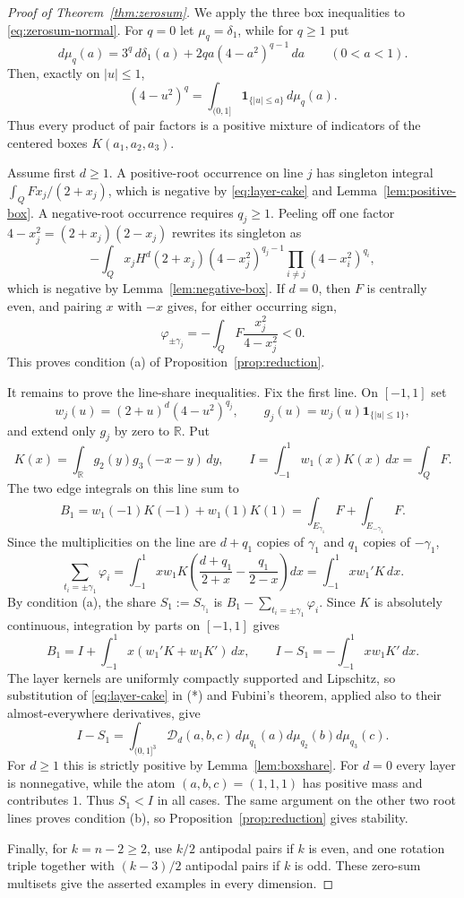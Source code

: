 \documentclass[11pt]{amsart}
\theoremstyle{definition}
\theoremstyle{remark}
\begin{document}
\begin{proof}[Proof of Theorem~\ref{thm:zerosum}]
We apply the three box inequalities to \eqref{eq:zerosum-normal}. For
$q=0$ let $\mu_q=\delta_1$, while for $q\ge1$ put
\begin{equation}\label{eq:layer-measure}
 d\mu_q(a)=3^q\,d\delta_1(a)
       +2qa(4-a^2)^{q-1}\,da\qquad(0<a<1).
\end{equation}
Then, exactly on $|u|\le1$,
\begin{equation}\label{eq:layer-cake}
 (4-u^2)^q
 =\int_{(0,1]}\mathbf1_{\{|u|\le a\}}\,d\mu_q(a).
\end{equation}
Thus every product of pair factors is a positive mixture of indicators of
the centered boxes $K(a_1,a_2,a_3)$.

Assume first $d\ge1$. A positive-root occurrence on line $j$ has
singleton integral $\int_QF x_j/(2+x_j)$, which is negative by
\eqref{eq:layer-cake} and Lemma~\ref{lem:positive-box}. A negative-root
occurrence requires $q_j\ge1$. Peeling off one factor
$4-x_j^2=(2+x_j)(2-x_j)$ rewrites its singleton as
\[
 -\int_Qx_jH^d(2+x_j)(4-x_j^2)^{q_j-1}
       \prod_{i\ne j}(4-x_i^2)^{q_i},
\]
which is negative by Lemma~\ref{lem:negative-box}. If $d=0$, then $F$ is
centrally even, and pairing $x$ with $-x$ gives, for either occurring sign,
\[
 \varphi_{\pm\gamma_j}=-\int_QF\frac{x_j^2}{4-x_j^2}<0.
\]
This proves condition (a) of Proposition~\ref{prop:reduction}.

It remains to prove the line-share inequalities. Fix the first line. On
$[-1,1]$ set
\[
 w_j(u)=(2+u)^d(4-u^2)^{q_j},\qquad
 g_j(u)=w_j(u)\mathbf1_{\{|u|\le1\}},
\]
and extend only $g_j$ by zero to $\mathbb R$. Put
\[
K(x)=\int_{\mathbb R}g_2(y)g_3(-x-y)\,dy,
 \qquad I=\int_{-1}^1w_1(x)K(x)\,dx=\int_QF.
\]
The two edge integrals on this line sum to
\[
 B_1=w_1(-1)K(-1)+w_1(1)K(1)
 =\int_{E_{\gamma_1}}F+\int_{E_{-\gamma_1}}F.
\]
Since the multiplicities on the line are
$d+q_1$ copies of $\gamma_1$ and $q_1$ copies of $-\gamma_1$,
\[
\sum_{t_i=\pm\gamma_1}\varphi_i
 =\int_{-1}^1xw_1K\left(\frac{d+q_1}{2+x}-\frac{q_1}{2-x}\right)dx
 =\int_{-1}^1xw_1'K\,dx.
\]
By condition (a), the share $S_1:=S_{\gamma_1}$ is
$B_1-\sum_{t_i=\pm\gamma_1}\varphi_i$. Since $K$ is absolutely
continuous, integration by parts on $[-1,1]$ gives
\[
 B_1=I+\int_{-1}^1x(w_1'K+w_1K')\,dx,\qquad
 I-S_1=-\int_{-1}^1xw_1K'\,dx.                  \tag{*}
\]
The layer kernels are uniformly compactly supported and Lipschitz, so
substitution of \eqref{eq:layer-cake} in (*) and Fubini's theorem, applied
also to their almost-everywhere derivatives, give
\[
 I-S_1=\int_{(0,1]^3}\mathcal D_d(a,b,c)\,
 d\mu_{q_1}(a)d\mu_{q_2}(b)d\mu_{q_3}(c).
\]
For $d\ge1$ this is strictly positive by Lemma~\ref{lem:boxshare}. For
$d=0$ every layer is nonnegative, while the atom $(a,b,c)=(1,1,1)$ has
positive mass and contributes $1$. Thus $S_1<I$ in all cases. The same
argument on the other two root lines proves condition (b), so
Proposition~\ref{prop:reduction} gives stability.

Finally, for $k=n-2\ge2$, use $k/2$ antipodal pairs if $k$ is even, and
one rotation triple together with $(k-3)/2$ antipodal pairs if $k$ is odd.
These zero-sum multisets give the asserted examples in every dimension.
\end{proof}
\end{document}

